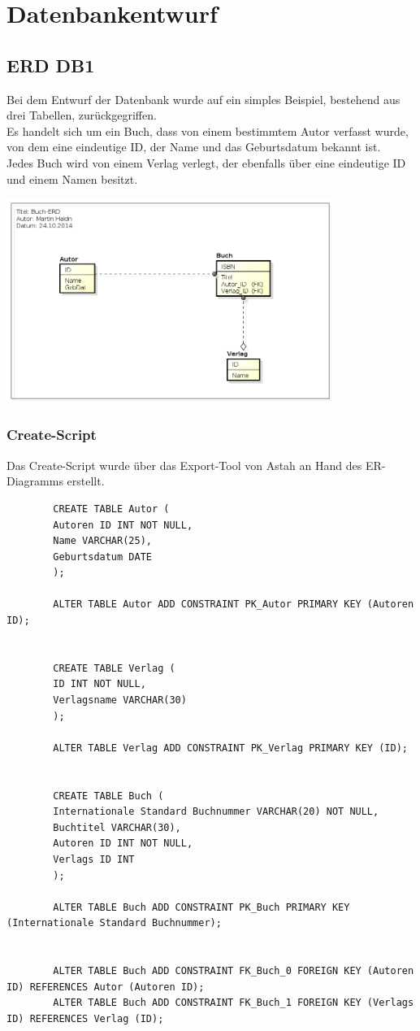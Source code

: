 \documentclass[a4paper]{article}
\begin{document}
	\newpage
	\section{Datenbankentwurf}
	\subsection{ERD DB1}
	Bei dem Entwurf der Datenbank wurde auf ein simples Beispiel, bestehend aus drei Tabellen, zurückgegriffen.\\
	Es handelt sich um ein Buch, dass von einem bestimmtem Autor verfasst wurde, von dem eine eindeutige ID, der Name und das Geburtsdatum bekannt ist.\\
	Jedes Buch wird von einem Verlag verlegt, der ebenfalls über eine eindeutige ID und einem Namen besitzt.
	\begin{center}
		\includegraphics[width=0.8\textwidth]{img/buch-erd.png}
	\end{center}
	
	\subsubsection{Create-Script}
	Das Create-Script wurde über das Export-Tool von Astah an Hand des ER-Diagramms erstellt.\\
	\begin{tiny}
		\begin{lstlisting}
		CREATE TABLE Autor (
		Autoren ID INT NOT NULL,
		Name VARCHAR(25),
		Geburtsdatum DATE
		);
		
		ALTER TABLE Autor ADD CONSTRAINT PK_Autor PRIMARY KEY (Autoren ID);
		
		
		CREATE TABLE Verlag (
		ID INT NOT NULL,
		Verlagsname VARCHAR(30)
		);
		
		ALTER TABLE Verlag ADD CONSTRAINT PK_Verlag PRIMARY KEY (ID);
		
		
		CREATE TABLE Buch (
		Internationale Standard Buchnummer VARCHAR(20) NOT NULL,
		Buchtitel VARCHAR(30),
		Autoren ID INT NOT NULL,
		Verlags ID INT
		);
		
		ALTER TABLE Buch ADD CONSTRAINT PK_Buch PRIMARY KEY (Internationale Standard Buchnummer);
		
		
		ALTER TABLE Buch ADD CONSTRAINT FK_Buch_0 FOREIGN KEY (Autoren ID) REFERENCES Autor (Autoren ID);
		ALTER TABLE Buch ADD CONSTRAINT FK_Buch_1 FOREIGN KEY (Verlags ID) REFERENCES Verlag (ID);
		\end{lstlisting}
	\end{tiny}
	
\end{document}
